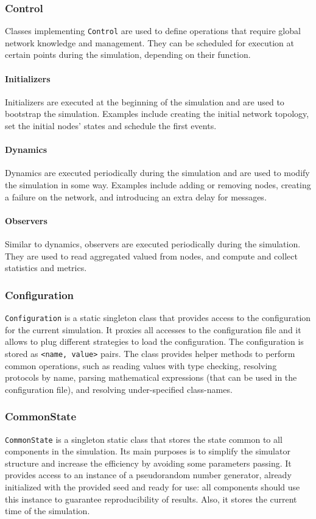 \subsubsection{Control}
Classes implementing \texttt{Control} are used to define operations that require global network knowledge and management.
They can be scheduled for execution at certain points during the simulation, depending on their function.

\paragraph{Initializers}
Initializers are executed at the beginning of the simulation and are used to bootstrap the simulation.
Examples include creating the initial network topology, set the initial nodes' states and schedule the first events.

\paragraph{Dynamics}
Dynamics are executed periodically during the simulation and are used to modify the simulation in some way.
Examples include adding or removing nodes, creating a failure on the network, and introducing an extra delay for messages.

\paragraph{Observers}
Similar to dynamics, observers are executed periodically during the simulation.
They are used to read aggregated valued from nodes, and compute and collect statistics and metrics.

\subsubsection{Configuration}
\texttt{Configuration} is a static singleton class that provides access to the configuration for the current simulation.
It proxies all accesses to the configuration file and it allows to plug different strategies to load the configuration.
The configuration is stored as \texttt{<name, value>} pairs.
The class provides helper methods to perform common operations, such as reading values with type checking, resolving protocols by name, parsing mathematical expressions (that can be used in the configuration file), and resolving under-specified class-names.

\subsubsection{CommonState}
\texttt{CommonState} is a singleton static class that stores the state common to all components in the simulation.
Its main purposes is to simplify the simulator structure and increase the efficiency by avoiding some parameters passing.
It provides access to an instance of a pseudorandom number generator, already initialized with the provided seed and ready for use:
all components should use this instance to guarantee reproducibility of results.
Also, it stores the current time of the simulation.

